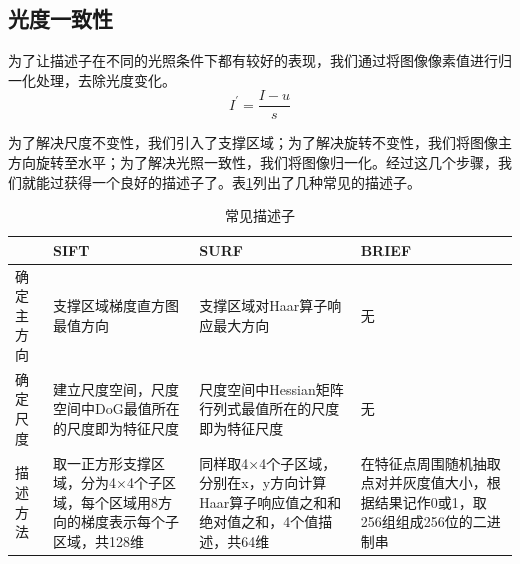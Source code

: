 \subsection{光度一致性}
为了让描述子在不同的光照条件下都有较好的表现，我们通过将图像像素值进行归一化处理，去除光度变化。
\begin{equation}
I^{\prime}=\frac{I-u}{s}
\end{equation}\par
为了解决尺度不变性，我们引入了支撑区域；为了解决旋转不变性，我们将图像主方向旋转至水平；为了解决光照一致性，我们将图像归一化。经过这几个步骤，我们就能过获得一个良好的描述子了。表\ref{descriptors}列出了几种常见的描述子。
\begin{table}[htbp]
	\caption{常见描述子}
	\label{descriptors}
	\begin{tabular}{p{}<{\centering} p{}<{\centering} p{}<{\centering} p{}<{\centering}}
		\toprule
		\multicolumn{1}{c}{} & SIFT                                         & SURF                                              & BRIEF                                                \\ \midrule
		确定主方向                & 支撑区域梯度直方图最值方向                                & 支撑区域对Haar算子响应最大方向                                 & 无                                                    \\ \midrule
		确定尺度                 & 建立尺度空间，尺度空间中DoG最值所在的尺度即为特征尺度                 & 尺度空间中Hessian矩阵行列式最值所在的尺度即为特征尺度                    & 无                                                    \\ \midrule
		描述方法                 & 取一正方形支撑区域，分为4×4个子区域，每个区域用8方向的梯度表示每个子区域，共128维 & 同样取4×4个子区域，分别在x，y方向计算Haar算子响应值之和和绝对值之和，4个值描述，共64维 & 在特征点周围随机抽取点对并灰度值大小，根据结果记作0或1，取256组组成256位的二进制串 \\ \bottomrule
	\end{tabular}
\end{table}
